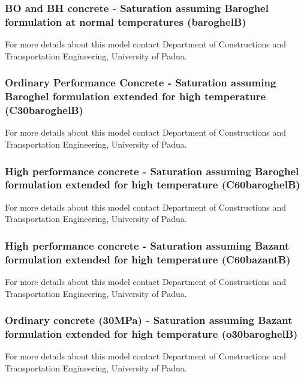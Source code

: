 \subsubsection{BO and BH concrete - Saturation assuming Baroghel formulation at normal temperatures (baroghelB)}

For more details about this model contact Department of Constructions and Transportation Engineering, University of Padua.

\subsubsection{Ordinary Performance Concrete - Saturation assuming Baroghel formulation extended for high temperature (C30baroghelB)}

For more details about this model contact Department of Constructions and Transportation Engineering, University of Padua.

\subsubsection{High performance concrete - Saturation assuming Baroghel formulation extended for high temperature (C60baroghelB)}

For more details about this model contact Department of Constructions and Transportation Engineering, University of Padua.

\subsubsection{High performance concrete - Saturation assuming Bazant formulation extended for high temperature (C60bazantB)}

For more details about this model contact Department of Constructions and Transportation Engineering, University of Padua.

\subsubsection{Ordinary concrete (30MPa) - Saturation assuming Bazant formulation extended for high temperature (o30baroghelB)}

For more details about this model contact Department of Constructions and Transportation Engineering, University of Padua.
